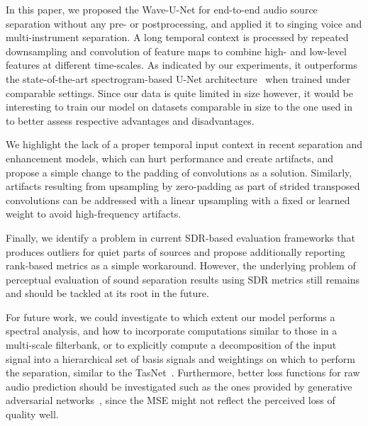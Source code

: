 \documentclass{article}
\begin{document}
In this paper, we proposed the Wave-U-Net for end-to-end audio source separation without any pre- or postprocessing, and applied it to singing voice and multi-instrument separation.
A long temporal context is processed by repeated downsampling and convolution of feature maps to combine high- and low-level features at different time-scales.
As indicated by our experiments, it outperforms the state-of-the-art spectrogram-based U-Net architecture~\cite{Jansson2017} when trained under comparable settings.
Since our data is quite limited in size however, it would be interesting to train our model on datasets comparable in size to the one used in~\cite{Jansson2017} to better assess respective advantages and disadvantages.

We highlight the lack of a proper temporal input context in recent separation and enhancement models, which can hurt performance and create artifacts, and propose a simple change to the padding of convolutions as a solution.
Similarly, artifacts resulting from upsampling by zero-padding as part of strided transposed convolutions can be addressed with a linear upsampling with a fixed or learned weight to avoid high-frequency artifacts.

Finally, we identify a problem in current SDR-based evaluation frameworks that produces outliers for quiet parts of sources and propose additionally reporting rank-based metrics as a simple workaround.
However, the underlying problem of perceptual evaluation of sound separation results using SDR metrics still remains and should be tackled at its root in the future.

For future work, we could investigate to which extent our model performs a spectral analysis, and how to incorporate computations similar to those in a multi-scale filterbank, or to explicitly compute a decomposition of the input signal into a hierarchical set of basis signals and weightings on which to perform the separation, similar to the TasNet~\cite{Luo2017a}.
Furthermore, better loss functions for raw audio prediction should be investigated such as the ones provided by generative adversarial networks~\cite{Goodfellow2014,Stoller2018}, since the MSE might not reflect the perceived loss of quality well.


\end{document}
